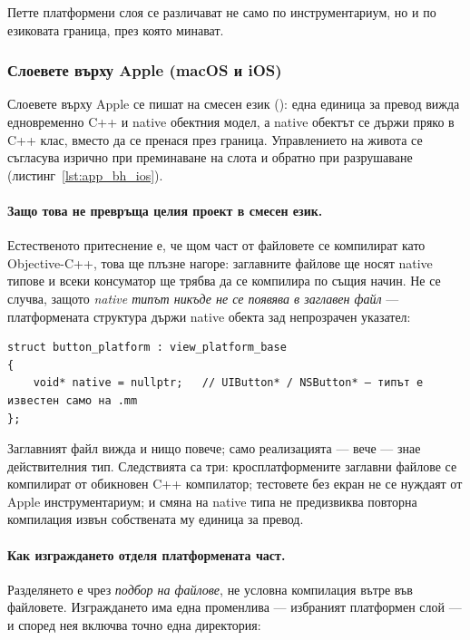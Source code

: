 Петте платформени слоя се различават не само по инструментариум, но и по езиковата
граница, през която минават.

\subsubsection{Слоевете върху Apple (macOS и iOS)}

Слоевете върху Apple се пишат на смесен език (): една единица за превод вижда
едновременно C++ и native обектния модел, а native обектът се държи пряко в C++ клас,
вместо да се пренася през граница. Управлението на живота се съгласува изрично при
преминаване на слота и обратно при разрушаване (листинг~\ref{lst:app_bh_ios}).

\paragraph{Защо това не превръща целия проект в смесен език.} Естественото притеснение е,
че щом част от файловете се компилират като Objective-C++, това ще плъзне нагоре:
заглавните файлове ще носят native типове и всеки консуматор ще трябва да се компилира по
същия начин. Не се случва, защото \emph{native типът никъде не се появява в заглавен файл}
--- платформената структура държи native обекта зад непрозрачен указател:

\begin{lstlisting}[caption={Native обектът зад непрозрачен слот},label={lst:opaque},
  basicstyle=\scriptsize\ttfamily]
struct button_platform : view_platform_base
{
    void* native = nullptr;   // UIButton* / NSButton* — типът е известен само на .mm
};
\end{lstlisting}

Заглавният файл вижда  и нищо повече; само реализацията --- вече  ---
знае действителния тип. Следствията са три: кросплатформените заглавни файлове се
компилират от обикновен C++ компилатор; тестовете без екран не се нуждаят от Apple
инструментариум; и смяна на native типа не предизвиква повторна компилация извън собствената
му единица за превод.

\paragraph{Как изграждането отделя платформената част.} Разделянето е чрез \emph{подбор на
файлове}, не условна компилация вътре във файловете. Изграждането има една променлива ---
избраният платформен слой --- и според нея включва точно една директория:


